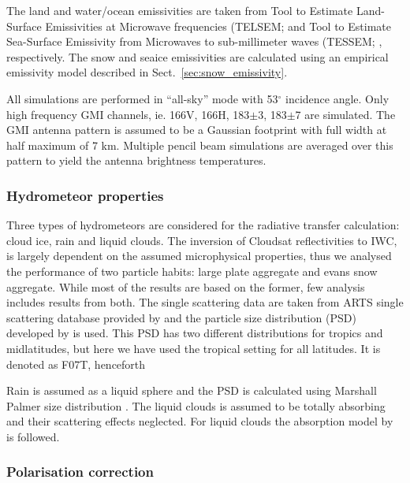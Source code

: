 \documentclass[amt, manuscript]{copernicus}
\begin{document}
The land and water/ocean emissivities are taken from Tool to Estimate Land-Surface Emissivities at Microwave frequencies (TELSEM; \citep{aires2011tool} and  Tool to Estimate Sea-Surface Emissivity from Microwaves to sub-millimeter waves (TESSEM;
\citep{prigent2017sea}, respectively. The snow and seaice emissivities are calculated using an empirical emissivity model described in Sect.~\ref{sec:snow_emissivity}.

All simulations are performed in ``all-sky'' mode with 53$^{\circ}$ incidence angle. Only high frequency GMI channels, ie. 166V, 166H, 183$\pm$3, 183$\pm$7 are simulated. The GMI antenna pattern is assumed to be a Gaussian footprint with full width at half maximum of 7\,\,km. Multiple pencil beam simulations are averaged over this pattern to yield the antenna brightness temperatures.   

\subsubsection{Hydrometeor properties}
\label{sec:hydrometeor_prop}

Three types of hydrometeors are considered for the radiative transfer calculation: cloud ice, rain and liquid clouds. The inversion of Cloudsat reflectivities to IWC, is largely dependent on the assumed microphysical properties, thus we analysed the performance of two particle habits: large plate aggregate and evans snow aggregate. While most of the results are based on the former, few analysis includes results from both. The single scattering data are taken from ARTS single scattering database provided by \citet{eriksson:agene:18} and the particle size distribution (PSD) developed by \citet{field:snows:07} is used. This PSD has two different distributions for tropics and midlatitudes, but here we have used the tropical setting for all latitudes. It is denoted as F07T, henceforth

Rain is assumed as a liquid sphere and the PSD is calculated using Marshall Palmer size distribution \citep{marshall:thedi:48}. The liquid clouds is assumed to be totally absorbing and their scattering effects neglected. For liquid clouds the absorption model by \citet{ellison2007permittivity} is followed.  


\subsubsection{Polarisation correction}
\label{sec:scaling_factor}
\end{document}
